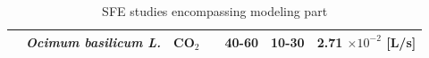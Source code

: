 \documentclass[a4paper,fleqn]{cas-dc}
\begin{document}
\begin{table}[h!]
{\begin{tabular}{|p{2.5cm}|p{2cm}|p{1.75cm}|p{4.5cm}|p{1.5cm}|p{1.5cm}|p{3cm}|}
		\citet{Zekovic2014} & \textit{Ocimum basilicum L.} & CO$_2$ & \citet{Brunner1994} \newline \citet{Kandiah1990} \newline \citet{Esquivel1999} &  40-60  & 10-30 & 2.71 $\times 10^{-2}$ [L/s]\\ \hline
	\end{tabular} }
	\caption{SFE studies encompassing modeling part}
	\label{fig: SFE_Literature}
\end{table}
\end{document}
